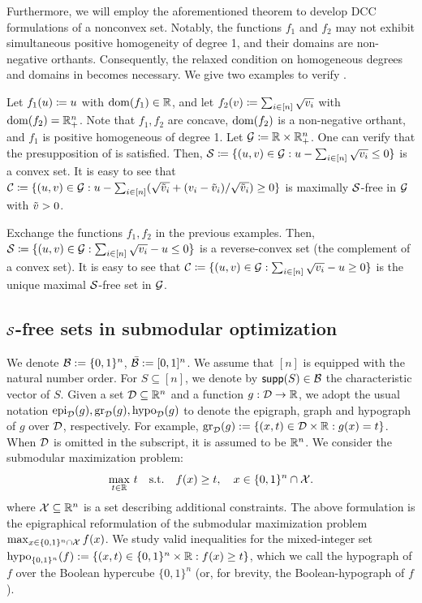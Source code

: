 Furthermore, we will employ the aforementioned theorem to develop DCC formulations of a nonconvex set. Notably, the functions $f_1$ and $f_2$ may not exhibit simultaneous positive homogeneity of degree 1, and their domains are non-negative orthants. Consequently, the relaxed condition on homogeneous degrees and domains in  becomes necessary. We give two examples to verify .
\begin{example}
    Let $f_1(u) \coloneqq u$ with $\operatorname{dom}(f_1) \in \mathbb R$, and let $f_2(v) \coloneqq \sum_{i \in [n]}\sqrt{v_i}$ with $\operatorname{dom}(f_2) = \mathbb R^n_{+}$. Note that $f_1,f_2$ are concave, $\operatorname{dom}(f_2)$ is a non-negative orthant, and $f_1$ is positive homogeneous of degree 1. Let $\mathcal G \coloneqq \mathbb R \times \mathbb R^n_{+}$. One can verify that the presupposition of   is satisfied. Then, $\mathcal S \coloneqq \{(u,v) \in \mathcal G: u -   \sum_{i \in [n]}\sqrt{v_i}\le 0\}$ is a convex set. It is easy to see that $\mathcal C \coloneqq \{(u,v) \in \mathcal G: u -  \sum_{i \in [n]}(\sqrt{\tilde{v}_i} + (v_i - \tilde{v}_i)/ \sqrt{\tilde{v}_i}) \ge 0\}$ is maximally $\mathcal S$-free in $\mathcal G$ with $\tilde{v} > 0$.
\end{example}
\begin{example}
Exchange the functions $f_1,f_2$ in the previous examples. Then, $\mathcal S \coloneqq \{(u,v) \in \mathcal G:    \sum_{i \in [n]}\sqrt{v_i} - u\le 0\}$ is a reverse-convex set (\ie the complement of a convex set). It is easy to see that $\mathcal C \coloneqq \{(u,v) \in \mathcal G: \sum_{i \in [n]}\sqrt{v_i} - u \ge 0\}$ is the unique maximal $\mathcal S$-free  set in $\mathcal G$.
\end{example}


\subsection{$\mathcal S$-free sets in submodular optimization}\label{sec.freeforsub}

We denote $\mathcal B := \{0,1\}^n$, $\bar{\mathcal B}: = [0,1]^n$. We assume that $[n]$ is equipped with the natural number order.
For $S \subseteq [n]$, we denote by $\mathsf{supp}(S) \in \mathcal B$ the characteristic vector of $S$. Given a set $\mathcal D \subseteq \mathbb R^n$ and a function $g: \mathcal D \to \mathbb R$, we adopt the usual notation $\operatorname{epi}_{\mathcal D}(g), \operatorname{gr}_{\mathcal D}(g), \operatorname{hypo}_{\mathcal D}(g)$ to denote the epigraph, graph and hypograph of $g$ over $\mathcal D$, respectively. For example, $\operatorname{gr}_{\mathcal D}(g) := \{(x,t) \in\mathcal D \times \mathbb R: g(x) = t\}$. When  $\mathcal D$ is omitted in the subscript, it is assumed to be $\mathbb R^n$.
We consider the submodular maximization problem:
\begin{equation}
\label{eq.milp}
    \max_{t \in \mathbb R} \, t \quad \textup{s.t.}  \quad f(x) \ge t, \quad x  \in \{0,1\}^n \cap \mathcal X.   
\end{equation}
where  $\mathcal X \subseteq \mathbb R^n$ is  a set describing additional constraints. The above formulation is the epigraphical reformulation of the submodular maximization problem $\max_{x  \in \{0,1\}^n \cap \mathcal X} f(x)$.  We study valid inequalities for the mixed-integer set $\operatorname{hypo}_{\{0,1\}^n}(f):=\{(x,t) \in \{0,1\}^n \times \mathbb R: f(x) \ge t\}$, which we call the hypograph of $f$ over the Boolean hypercube $\{0,1\}^n$ (or, for brevity, the Boolean-hypograph of $f$).



